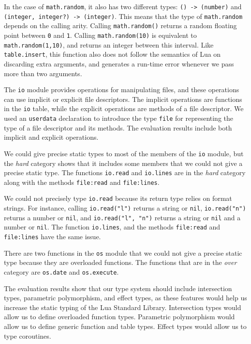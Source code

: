 In the case of \texttt{math.random}, it also has two different types:
\texttt{() -> (number)} and \texttt{(integer, integer?) -> (integer)}.
This means that the type of \texttt{math.random} depends on the calling arity.
Calling \texttt{math.random()} returns a random floating point
between \texttt{0} and \texttt{1}.
Calling \texttt{math.random(10)} is equivalent to \texttt{math.random(1,10)},
and returns an integer between this interval.
Like \texttt{table.insert}, this function also does not follow the
semantics of Lua on discarding extra arguments,
and generates a run-time error whenever we pass more than two arguments.

The \texttt{io} module provides operations for manipulating files,
and these operations can use implicit or explicit file descriptors.
The implicit operations are functions in the \texttt{io} table,
while the explicit operations are methods of a file descriptor.
We used an \texttt{userdata} declaration to introduce the type
\texttt{file} for representing the type of a file descriptor
and its methods.
The evaluation results include both implicit and explicit operations.

We could give precise static types to most of the members of the
\texttt{io} module, but the \emph{hard} category shows that it
includes some members that we could not give a precise static type.
The functions \texttt{io.read} and \texttt{io.lines} are
in the \emph{hard} category along with the methods
\texttt{file:read} and \texttt{file:lines}.

We could not precisely type \texttt{io.read} because its return type
relies on format strings.
For instance, calling \texttt{io.read("l")} returns a string or \texttt{nil},
\texttt{io.read("n")} returns a number or \texttt{nil}, and
\texttt{io.read("l", "n")} returns a string or \texttt{nil} and a number or \texttt{nil}.
The function \texttt{io.lines}, and the methods \texttt{file:read} and
\texttt{file:lines} have the same issue.

There are two functions in the \texttt{os} module that we could
not give a precise static type because they are overloaded functions.
The functions that are in the \emph{over} category are
\texttt{os.date} and \texttt{os.execute}.

The evaluation results show that our type system should include
intersection types, parametric polymorphism, and effect types,
as these features would help us increase the static typing of the
Lua Standard Library.
Intersection types would allow us to define overloaded function types.
Parametric polymorphism would allow us to define generic function and table types.
Effect types would allow us to type coroutines.

